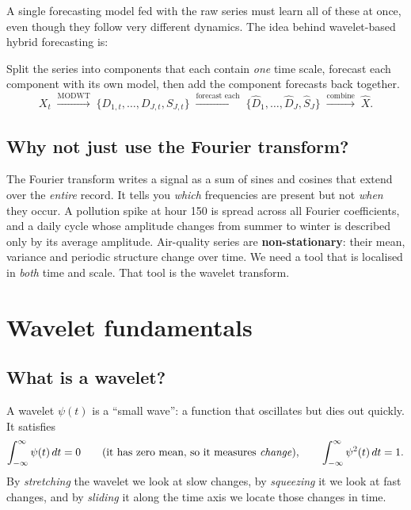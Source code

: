\documentclass[11pt,a4paper]{article}
\begin{document}
A single forecasting model fed with the raw series must learn all of these at once, even though
they follow very different dynamics. The idea behind wavelet-based hybrid forecasting is:

\begin{keybox}
Split the series into components that each contain \emph{one} time scale, forecast each component
with its own model, then add the component forecasts back together.
\[
  X_t \;\xrightarrow{\text{MODWT}}\; \{D_{1,t},\dots,D_{J,t},S_{J,t}\}
  \;\xrightarrow{\text{forecast each}}\; \{\hat D_{1},\dots,\hat D_{J},\hat S_{J}\}
  \;\xrightarrow{\text{combine}}\; \hat X .
\]
\end{keybox}

\subsection{Why not just use the Fourier transform?}

The Fourier transform writes a signal as a sum of sines and cosines that extend over the
\emph{entire} record. It tells you \emph{which} frequencies are present but not \emph{when} they occur.
A pollution spike at hour 150 is spread across all Fourier coefficients, and a daily cycle whose
amplitude changes from summer to winter is described only by its average amplitude.
Air-quality series are \textbf{non-stationary}: their mean, variance and periodic structure
change over time. We need a tool that is localised in \emph{both} time and scale. That tool is the
wavelet transform.

\section{Wavelet fundamentals}

\subsection{What is a wavelet?}

A wavelet $\psi(t)$ is a ``small wave'': a function that oscillates but dies out quickly. It satisfies
\[
  \int_{-\infty}^{\infty}\psi(t)\,dt = 0 \qquad\text{(it has zero mean, so it measures \emph{change})},
  \qquad
  \int_{-\infty}^{\infty}\psi^2(t)\,dt = 1 .
\]
By \emph{stretching} the wavelet we look at slow changes, by \emph{squeezing} it we look at fast changes,
and by \emph{sliding} it along the time axis we locate those changes in time.
\end{document}
